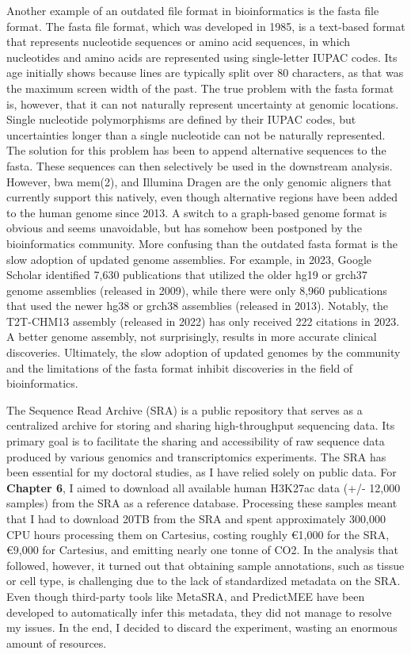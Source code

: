 Another example of an outdated file format in bioinformatics is the fasta file format\cite{Lipman1985}. The fasta file format, which was developed in 1985, is a text-based format that represents nucleotide sequences or amino acid sequences, in which nucleotides and amino acids are represented using single-letter IUPAC codes. Its age initially shows because lines are typically split over 80 characters, as that was the maximum screen width of the past. The true problem with the fasta format is, however, that it can not naturally represent uncertainty at genomic locations. Single nucleotide polymorphisms are defined by their IUPAC codes, but uncertainties longer than a single nucleotide can not be naturally represented. The solution for this problem has been to append alternative sequences to the fasta. These sequences can then selectively be used in the downstream analysis. However, bwa mem(2)\cite{bwamem,bwamem2}, and Illumina Dragen are the only genomic aligners that currently support this natively, even though alternative regions have been added to the human genome since 2013. A switch to a graph-based genome format\cite{Li2020} is obvious and seems unavoidable, but has somehow been postponed by the bioinformatics community. More confusing than the outdated fasta format is the slow adoption of updated genome assemblies. For example, in 2023, Google Scholar identified 7,630 publications that utilized the older hg19 or grch37 genome assemblies (released in 2009), while there were only 8,960 publications that used the newer hg38 or grch38 assemblies (released in 2013). Notably, the T2T-CHM13 assembly (released in 2022) has only received 222 citations in 2023. A better genome assembly, not surprisingly, results in more accurate clinical discoveries\cite{Aganezov2022}. Ultimately, the slow adoption of updated genomes by the community and the limitations of the fasta format inhibit discoveries in the field of bioinformatics.

The Sequence Read Archive (SRA) is a public repository that serves as a centralized archive for storing and sharing high-throughput sequencing data. Its primary goal is to facilitate the sharing and accessibility of raw sequence data produced by various genomics and transcriptomics experiments. The SRA has been essential for my doctoral studies, as I have relied solely on public data. For \textbf{Chapter 6}, I aimed to download all available human H3K27ac data (+/- 12,000 samples) from the SRA as a reference database. Processing these samples meant that I had to download 20TB from the SRA and spent approximately 300,000 CPU hours processing them on Cartesius, costing roughly €1,000 for the SRA\cite{amazon}, €9,000 for Cartesius\cite{cartesius}, and emitting nearly one tonne of CO2\cite{CO2}. In the analysis that followed, however, it turned out that obtaining sample annotations, such as tissue or cell type, is challenging due to the lack of standardized metadata on the SRA. Even though third-party tools like MetaSRA\cite{Bernstein2017}, and PredictMEE\cite{Klie2021} have been developed to automatically infer this metadata, they did not manage to resolve my issues. In the end, I decided to discard the experiment, wasting an enormous amount of resources.

